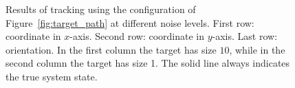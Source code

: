 \begin{figure}[htp]
  \caption{Results of tracking using the configuration of Figure~\ref{fig:target_path} at different
    noise levels.  First row: coordinate in $x$-axis. Second row: coordinate in $y$-axis. Last row:
    orientation.  In the first column the target has size $10$, while in the second column the
    target has size 1. The solid line always indicates the true system state.}
  \label{fig:tracking_big_small_target}
\end{figure}







